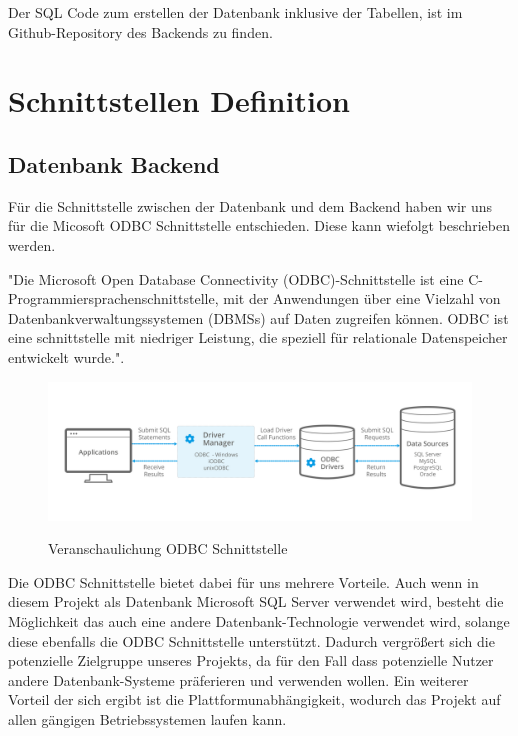 \documentclass{article}
\begin{document}
Der SQL Code zum erstellen der Datenbank inklusive der Tabellen, ist im
Github-Repository des Backends zu finden.

\newpage

\section{Schnittstellen Definition}

\subsection{Datenbank Backend}
Für die Schnittstelle zwischen der Datenbank und dem Backend haben wir uns für
die Micosoft ODBC Schnittstelle entschieden. Diese kann wiefolgt beschrieben
werden.

"Die Microsoft Open Database Connectivity (ODBC)-Schnittstelle ist eine C-Programmiersprachenschnittstelle, mit der Anwendungen über eine Vielzahl von Datenbankverwaltungssystemen (DBMSs) auf Daten zugreifen können. ODBC ist eine schnittstelle mit niedriger Leistung, die speziell für relationale Datenspeicher entwickelt wurde."\cite{MSODBC}.

\begin{figure}[h]
    \centering
    \includegraphics[width= \textwidth]{images/odbc.png}
    \caption{Veranschaulichung ODBC Schnittstelle}
    \label{fig:beispiel}
    \cite{ODBC}
\end{figure}

Die ODBC Schnittstelle bietet dabei für uns mehrere Vorteile. Auch wenn in
diesem Projekt als Datenbank Microsoft SQL Server verwendet wird, besteht die
Möglichkeit das auch eine andere Datenbank-Technologie verwendet wird, solange
diese ebenfalls die ODBC Schnittstelle unterstützt. Dadurch vergrößert sich die
potenzielle Zielgruppe unseres Projekts, da für den Fall dass potenzielle
Nutzer andere Datenbank-Systeme präferieren und verwenden wollen. Ein weiterer
Vorteil der sich ergibt ist die Plattformunabhängigkeit, wodurch das Projekt
auf allen gängigen Betriebssystemen laufen kann.
\end{document}
